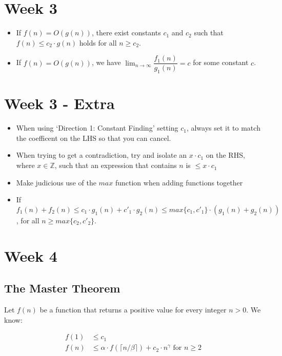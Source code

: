 \documentclass[5pt,a4paper]{article}
\begin{document}
\begin{multicols}{3}

\section{Week 3}

\begin{itemize}
\item If $f(n) = O(g(n))$, there exist constants $c_1$ and $c_2$ such that $f(n) \leqslant c_2 \cdot g(n)$ holds for all $n \geqslant c_2$.
\item If $f(n) = O(g(n))$, we have $\lim_{n \to \infty} \dfrac{f_1(n)}{g_1(n)} = c$ for some constant $c$. 
\end{itemize}

\section{Week 3 - Extra}

\begin{itemize}
\item When using `Direction 1: Constant Finding' setting $c_1$, always set it to match the coefficent on the LHS so that you can cancel.
\item When trying to get a contradiction, try and isolate an $x \cdot c_1$ on the RHS, where $x \in \mathbb{Z}$, such that an expression that contains $n$ is $\leqslant x \cdot c_1$
\item Make judicious use of the $max$ function when adding functions together
\item If $f_1(n) + f_2(n) \leqslant c_1 \cdot g_1(n) +c'_1 \cdot g_2(n) \leqslant max\{c_1 , c'_1 \} \cdot (g_1(n) + g_2(n))$, for all $n \geqslant max\{c_2, c'_2\}$.
\end{itemize}

\section{Week 4}
\subsection{The Master Theorem}

Let $f(n)$ be a function that returns a positive value for every integer $n>0$. We know:

\begin{align*}
f(1) & \leqslant c_1\\
f(n) & \leqslant \alpha \cdot f(\lceil n / \beta \rceil) + c_2 \cdot n^{\gamma} \text{ for } n \geqslant 2
\end{align*}


\end{multicols}
\end{document}
